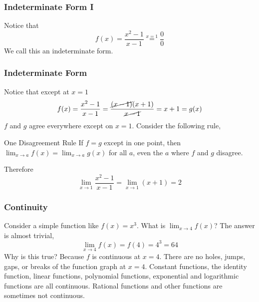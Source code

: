 \documentclass[xcolor=dvipsnames]{beamer}
\begin{document}
\begin{frame}
  \frametitle{Indeterminate Form I}
Notice that
\begin{equation}
  \label{eq:iicheeci}
  f(x)=\frac{x^{2}-1}{x-1}\overset{x=1}{=}\frac{0}{0}
\end{equation}
We call this an \alert{indeterminate form}.
\end{frame}

\begin{frame}
  \frametitle{Indeterminate Form}
Notice that except at $x=1$
\begin{equation}
  \label{eq:dooshool}
  f(x)=\frac{x^{2}-1}{x-1}=\frac{\cancel{(x-1)}(x+1)}{\cancel{x-1}}=x+1=g(x)
\end{equation}
$f$ and $g$ agree everywhere except on $x=1$. Consider the following
rule,
\begin{block}{One Disagreement Rule}
If $f=g$ except in one point, then
$\lim_{x\rightarrow{}a}f(x)=\lim_{x\rightarrow{}a}g(x)$ for all $a$,
even the $a$ where $f$ and $g$ disagree.
\end{block}
Therefore
\begin{equation}
  \label{eq:eengemia}
  \lim_{x\rightarrow{}1}\frac{x^{2}-1}{x-1}=\lim_{x\rightarrow{}1}(x+1)=2
\end{equation}
\end{frame}

\begin{frame}
  \frametitle{Continuity}
Consider a simple function like $f(x)=x^{3}$. What is
$\lim_{x\rightarrow{}4}f(x)$? The answer is almost trivial,
\begin{equation}
  \label{eq:iepeacha}
  \lim_{x\rightarrow{}4}f(x)=f(4)=4^{3}=64
\end{equation}
Why is this true? Because $f$ is continuous at $x=4$. There are no
holes, jumps, gaps, or breaks of the function graph at $x=4$. 
Constant functions, the identity
function, linear functions, polynomial functions, 
exponential and logarithmic functions are all continuous. Rational
functions and other functions are sometimes \alert{not} continuous.
\end{frame}
\end{document}
